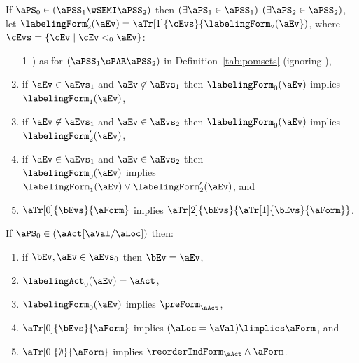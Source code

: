 \begin{definition}
  \noindent
  If $\aPS_0 \in (\aPSS_1\wSEMI\aPSS_2)$ then
  $(\exists\aPS_1\in\aPSS_1)$ $(\exists\aPS_2\in\aPSS_2)$,\\
  let $\labelingForm'_2(\aEv)=\aTr[1]{\cEvs}{\labelingForm_2(\aEv})$, where $\cEvs=\{ \cEv \mid \cEv <_0 \aEv \}$:
  \begin{enumerate}  
  \setcounter{enumi}{\value{pomsetParXount}}
  \item[1--\thepomsetParXount)] as for $(\aPSS_1\sPAR\aPSS_2)$  in
    Definition~\ref{tab:pomsets} (ignoring \thepomsetParDisjointXount),
  \item if $\aEv\in\aEvs_1$ and $\aEv\not\in\aEvs_1$ then $\labelingForm_0(\aEv)$ implies $\labelingForm_1(\aEv)$,
  \item if $\aEv\not\in\aEvs_1$ and $\aEv\in\aEvs_2$ then $\labelingForm_0(\aEv)$ implies $\labelingForm'_2(\aEv)$,
  \item if $\aEv\in\aEvs_1$ and $\aEv\in\aEvs_2$ then\\ $\labelingForm_0(\aEv)$ implies $\labelingForm_1(\aEv)\lor\labelingForm'_2(\aEv)$, and
  \item $\aTr[0]{\bEvs}{\aForm}$ implies $\aTr[2]{\bEvs}{\aTr[1]{\bEvs}{\aForm}}$.
  \end{enumerate}

  \noindent
  If $\aPS_0 \in (\aAct[\aVal/\aLoc])$ then:
  \begin{enumerate}
  \item if $\bEv,\aEv\in\aEvs_0$ then $\bEv=\aEv$,
  \item $\labelingAct_0(\aEv) = \aAct$,
  \item $\labelingForm_0(\aEv)$ implies $\preForm_\aAct$,
  \item $\aTr[0]{\bEvs}{\aForm}$ implies $(\aLoc=\aVal)\limplies\aForm$, and
  \item $\aTr[0]{\emptyset}{\aForm}$ implies $\reorderIndForm_\aAct\land\aForm$.
  \end{enumerate}
\end{definition}

